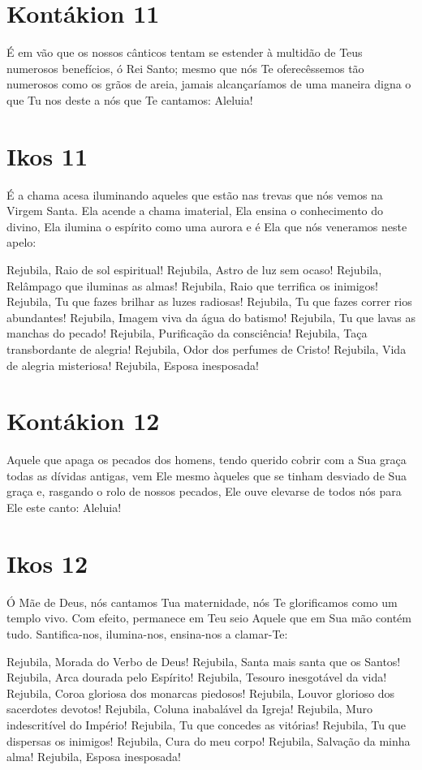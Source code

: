 \documentclass{subfiles}
\begin{document}
\section*{Kontákion 11}

É em vão que os nossos cânticos tentam se estender à multidão de
Teus numerosos benefícios, ó Rei Santo; mesmo que nós Te oferecêssemos tão
numerosos como os grãos de areia, jamais alcançaríamos de uma maneira
digna o que Tu nos deste a nós que Te cantamos: Aleluia!

\section*{Ikos 11}

É a chama acesa iluminando aqueles que estão nas trevas que nós
vemos na Virgem Santa. Ela acende a chama imaterial, Ela ensina o
conhecimento do divino, Ela ilumina o espírito como uma aurora e é Ela que
nós veneramos neste apelo:

Rejubila, Raio de sol espiritual!
Rejubila, Astro de luz sem ocaso!
Rejubila, Relâmpago que iluminas as almas!
Rejubila, Raio que terrifica os inimigos!
Rejubila, Tu que fazes brilhar as luzes radiosas!
Rejubila, Tu que fazes correr rios abundantes!
Rejubila, Imagem viva da água do batismo!
Rejubila, Tu que lavas as manchas do pecado!
Rejubila, Purificação da consciência!
Rejubila, Taça transbordante de alegria!
Rejubila, Odor dos perfumes de Cristo!
Rejubila, Vida de alegria misteriosa!
Rejubila, Esposa inesposada!

\section*{Kontákion 12}

Aquele que apaga os pecados dos homens, tendo querido cobrir com a Sua graça
todas as dívidas antigas, vem Ele mesmo àqueles que se tinham desviado de Sua
graça e, rasgando o rolo de nossos pecados, Ele ouve elevarse de todos nós para
Ele este canto: Aleluia!

\section*{Ikos 12}

Ó Mãe de Deus, nós cantamos Tua maternidade, nós Te glorificamos
como um templo vivo. Com efeito, permanece em Teu seio Aquele que em Sua
mão contém tudo. Santifica-nos, ilumina-nos, ensina-nos a clamar-Te:

Rejubila, Morada do Verbo de Deus!
Rejubila, Santa mais santa que os Santos!
Rejubila, Arca dourada pelo Espírito!
Rejubila, Tesouro inesgotável da vida!
Rejubila, Coroa gloriosa dos monarcas piedosos!
Rejubila, Louvor glorioso dos sacerdotes devotos!
Rejubila, Coluna inabalável da Igreja!
Rejubila, Muro indescritível do Império!
Rejubila, Tu que concedes as vitórias!
Rejubila, Tu que dispersas os inimigos!
Rejubila, Cura do meu corpo!
Rejubila, Salvação da minha alma!
Rejubila, Esposa inesposada!
\end{document}
